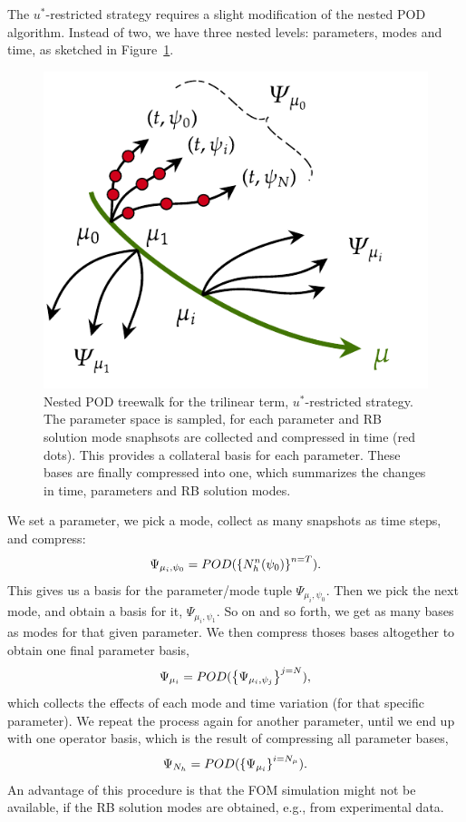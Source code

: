\documentclass[../../thesis.tex]{subfiles}
\begin{document}
The \mbox{$u^{*}$-restricted} strategy requires a slight modification of the nested POD algorithm.
Instead of two, we have three nested levels: 
parameters, modes and time, as sketched in Figure~\ref{fig:treewalk_trilinear_sketch}.
\begin{figure}[h]
    \centering
    \includegraphics[width=0.8\columnwidth]{research_project/piston/figures/treewalk-trilinear.pdf}
    \caption{Nested POD treewalk for the trilinear term, 
    \mbox{$u^{*}$-restricted} strategy.
    The parameter space is sampled, for each parameter and RB solution mode 
    snaphsots are collected and compressed in time (red dots).
    This provides a collateral basis for each parameter.
    These bases are finally compressed into one, 
    which summarizes the changes in time, parameters and RB solution modes.}
    \label{fig:treewalk_trilinear_sketch}
\end{figure}

We set a parameter, we pick a mode, collect as many snapshots
as time steps, and compress:
\begin{equation}
    \Psi_{\mu_i, \psi_0} = POD(\qty{N^{n}_h(\psi_0)}^{n=T}).
\end{equation}
This gives us a basis for the parameter/mode tuple $\Psi_{\mu_i, \psi_0}$. 
Then we pick the next mode, and obtain a basis for it, $\Psi_{\mu_i, \psi_1}$.
So on and so forth, we get as many bases as modes for that given parameter.
We then compress thoses bases altogether to obtain one final parameter basis,
\begin{equation}
    \Psi_{\mu_i} = POD(\qty{\Psi_{\mu_i, \psi_j}}^{j=N}),
\end{equation}
which collects the effects of each mode and time variation (for that specific parameter).
We repeat the process again for another parameter, 
until we end up with one operator basis,
which is the result of compressing all parameter bases,
\begin{equation}
    \Psi_{N_h} = POD(\qty{\Psi_{\mu_i}}^{i=N_{\mu}}).
\end{equation}
An advantage of this procedure is that the FOM simulation 
might not be available, 
if the RB solution modes are obtained, e.g., from experimental data.
\end{document}
